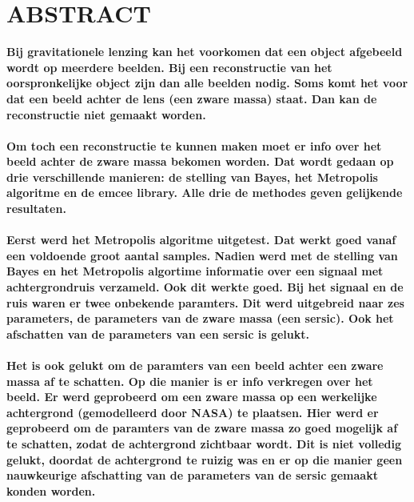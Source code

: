 \section*{ABSTRACT}
\textbf{Bij gravitationele lenzing kan het voorkomen dat een object afgebeeld wordt op meerdere beelden. Bij een reconstructie van het oorspronkelijke object zijn dan alle beelden nodig. Soms komt het voor dat een beeld achter de lens (een zware massa) staat. Dan kan de reconstructie niet gemaakt worden.\\ \\
Om toch een reconstructie te kunnen maken moet er info over het beeld achter de zware massa bekomen worden. Dat wordt gedaan op drie verschillende manieren: de stelling van Bayes, het Metropolis algoritme en de emcee library. Alle drie de methodes geven gelijkende resultaten. \\ \\
Eerst werd het Metropolis algoritme uitgetest. Dat werkt goed vanaf een voldoende groot aantal samples. Nadien werd met de stelling van Bayes en het Metropolis algortime informatie over een signaal met achtergrondruis verzameld. Ook dit werkte goed. Bij het signaal en de ruis waren er twee onbekende paramters. Dit werd uitgebreid naar zes parameters, de parameters van de zware massa (een sersic). Ook het afschatten van de parameters van een sersic is gelukt. \\ \\
Het is ook gelukt om de paramters van een beeld achter een zware massa af te schatten. Op die manier is er info verkregen over het beeld. Er werd geprobeerd om een zware massa op een werkelijke achtergrond (gemodelleerd door NASA) te plaatsen. Hier werd er geprobeerd om de paramters van de zware massa zo goed mogelijk af te schatten, zodat de achtergrond zichtbaar wordt. Dit is niet volledig gelukt, doordat de achtergrond te ruizig was en er op die manier geen nauwkeurige afschatting van de parameters van de sersic gemaakt konden worden.}